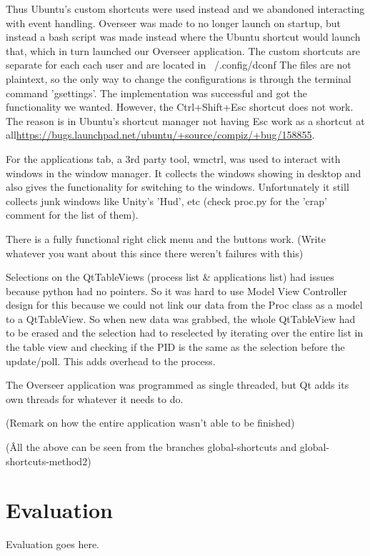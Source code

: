 \documentclass[12pt]{article}
\begin{document}
Thus Ubuntu's custom shortcuts were used instead and we abandoned interacting with event handling. Overseer was made to no longer launch on startup, but instead a bash script was made instead where the Ubuntu shortcut would launch that, which in turn launched our Overseer application.
The custom shortcuts are separate for each each user and are located in ~/.config/dconf
The files are not plaintext, so the only way to change the configurations is through the terminal command 'gsettings'.
The implementation was successful and got the functionality we wanted.
However, the Ctrl+Shift+Esc shortcut does not work. The reason is in Ubuntu's shortcut manager not having Esc work as a shortcut at all\url{https://bugs.launchpad.net/ubuntu/+source/compiz/+bug/158855}.

For the applications tab, a 3rd party tool, wmctrl, was used to interact with windows in the window manager.
It collects the windows showing in desktop and also gives the functionality for switching to the windows.
Unfortunately it still collects junk windows like Unity's 'Hud', etc (check proc.py for the 'crap' comment for the list of them).

There is a fully functional right click menu and the buttons work. (Write whatever you want about this since there weren't failures with this)

Selections on the QtTableViews (process list \& applications list) had issues because python had no pointers.
So it was hard to use Model View Controller design for this because we could not link our data from the Proc class as a model to a QtTableView.
So when new data was grabbed, the whole QtTableView had to be erased and the selection had to reselected by iterating over the entire list in the table view and checking if the PID is the same as the selection before the update/poll.
This adds overhead to the process.

The Overseer application was programmed as single threaded, but Qt adds its own threads for whatever it needs to do.

(Remark on how the entire application wasn't able to be finished)



(\^ All the above can be seen from the branches global-shortcuts and global-shortcuts-method2)

	
	
	\section{Evaluation}
	Evaluation goes here.
	
\end{document}
